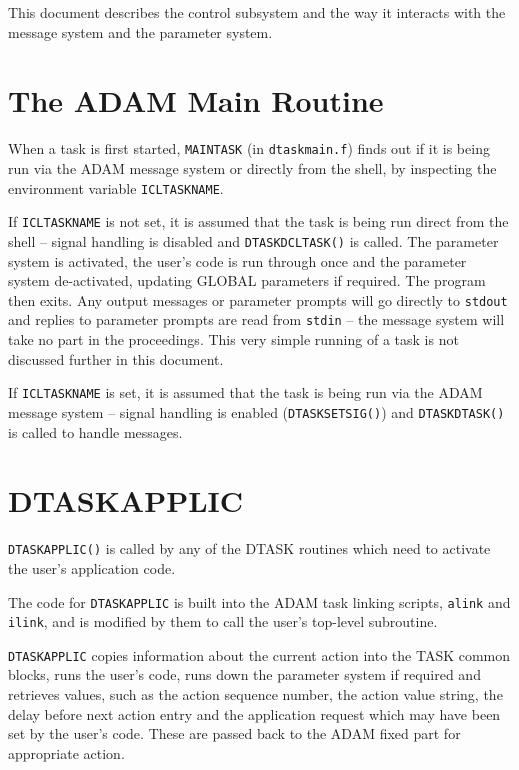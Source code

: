 \documentclass[twoside,11pt]{article}
\renewcommand{\_}{\texttt{\symbol{95}}}
\begin{document}
This document describes the control subsystem and the way it interacts with the
message system and the parameter system.

\section{\label{the_adam_main_routine}The ADAM Main Routine}
When a task is first started, \texttt{MAINTASK} (in \texttt{dtask\_main.f})
finds out if it is being run via the ADAM message system or directly from the
shell, by inspecting the environment variable \texttt{ICL\_TASK\_NAME}.

If \texttt{ICL\_TASK\_NAME} is not set, it is assumed that the task is being
run direct from the shell -- signal handling is disabled and
\texttt{DTASK\_DCLTASK()} is called. The parameter system is activated, the
user's code is run through once and the parameter system de-activated, updating
GLOBAL parameters if required. The program then exits. Any output messages
or parameter prompts will go directly to \texttt{stdout} and replies to
parameter prompts are read from \texttt{stdin} -- the message system will take
no part in the proceedings.
This very simple running of a task is not discussed further in this document.

If \texttt{ICL\_TASK\_NAME} is set, it is assumed that the task is being run
via the ADAM message system -- signal handling is enabled
(\texttt{DTASK\_SETSIG()}) and \texttt{DTASK\_DTASK()} is called to handle
messages.

\section{\label{dtask_applic}DTASK\_APPLIC}
\texttt{DTASK\_APPLIC()} is called by any of the DTASK routines which need to
activate the user's application code.

The code for \texttt{DTASK\_APPLIC} is built into the ADAM task linking
scripts, \texttt{alink} and \texttt{ilink}, and is modified by them to call
the user's top-level subroutine.

\texttt{DTASK\_APPLIC} copies information about the current action into the
TASK common blocks, runs the user's code, runs down the parameter system
if required and retrieves values, such as the action sequence number, the
action value string, the delay before next action entry and the application
request which may have been set by the user's code. These are passed back to
the ADAM fixed part for appropriate action.
\end{document}
